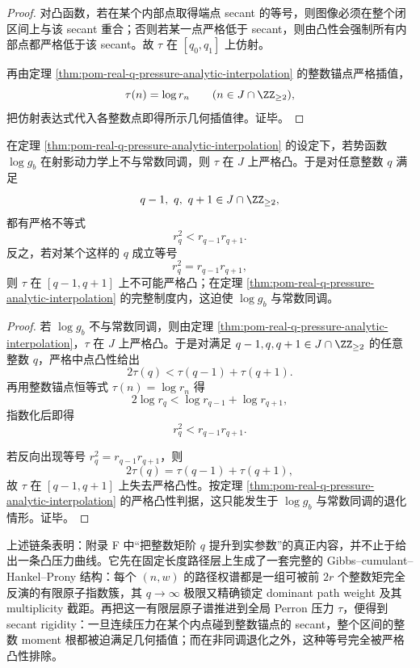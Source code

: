 \begin{proof}
对凸函数，若在某个内部点取得端点 secant 的等号，则图像必须在整个闭区间上与该 secant 重合；否则若某一点严格低于 secant，则由凸性会强制所有内部点都严格低于该 secant。故 \(\tau\) 在 \([q_0,q_1]\) 上仿射。

再由定理 \ref{thm:pom-real-q-pressure-analytic-interpolation} 的整数锚点严格插值，
\[
\tau(n)=\log r_n
\qquad(n\in J\cap\ZZ_{\ge 2}),
\]
把仿射表达式代入各整数点即得所示几何插值律。证毕。
\end{proof}

\begin{corollary}\label{cor:derived-projective-pressure-strict-logconvex-certificate}
在定理 \ref{thm:pom-real-q-pressure-analytic-interpolation} 的设定下，若势函数 \(\log g_b\) 在射影动力学上不与常数同调，则 \(\tau\) 在 \(J\) 上严格凸。于是对任意整数 \(q\) 满足
\[
q-1,\ q,\ q+1\in J\cap\ZZ_{\ge 2},
\]
都有严格不等式
\[
r_q^2<r_{q-1}r_{q+1}.
\]
反之，若对某个这样的 \(q\) 成立等号
\[
r_q^2=r_{q-1}r_{q+1},
\]
则 \(\tau\) 在 \([q-1,q+1]\) 上不可能严格凸；在定理 \ref{thm:pom-real-q-pressure-analytic-interpolation} 的完整制度内，这迫使 \(\log g_b\) 与常数同调。
\end{corollary}

\begin{proof}
若 \(\log g_b\) 不与常数同调，则由定理 \ref{thm:pom-real-q-pressure-analytic-interpolation}，\(\tau\) 在 \(J\) 上严格凸。于是对满足 \(q-1,q,q+1\in J\cap\ZZ_{\ge 2}\) 的任意整数 \(q\)，严格中点凸性给出
\[
2\tau(q)<\tau(q-1)+\tau(q+1).
\]
再用整数锚点恒等式 \(\tau(n)=\log r_n\) 得
\[
2\log r_q<\log r_{q-1}+\log r_{q+1},
\]
指数化后即得
\[
r_q^2<r_{q-1}r_{q+1}.
\]

若反向出现等号 \(r_q^2=r_{q-1}r_{q+1}\)，则
\[
2\tau(q)=\tau(q-1)+\tau(q+1),
\]
故 \(\tau\) 在 \([q-1,q+1]\) 上失去严格凸性。按定理 \ref{thm:pom-real-q-pressure-analytic-interpolation} 的严格凸性判据，这只能发生于 \(\log g_b\) 与常数同调的退化情形。证毕。
\end{proof}

\begin{remark}\label{rem:derived-projective-path-prony-secant-content}
上述链条表明：附录 F 中“把整数矩阶 \(q\) 提升到实参数”的真正内容，并不止于给出一条凸压力曲线。它先在固定长度路径层上生成了一套完整的 Gibbs--cumulant--Hankel--Prony 结构：每个 \((n,w)\) 的路径权谱都是一组可被前 \(2r\) 个整数矩完全反演的有限原子指数簇，其 \(q\to\infty\) 极限又精确锁定 dominant path weight 及其 multiplicity 截距。再把这一有限层原子谱推进到全局 Perron 压力 \(\tau\)，便得到 secant rigidity：一旦连续压力在某个内点碰到整数锚点的 secant，整个区间的整数 moment 根都被迫满足几何插值；而在非同调退化之外，这种等号完全被严格凸性排除。
\end{remark}
